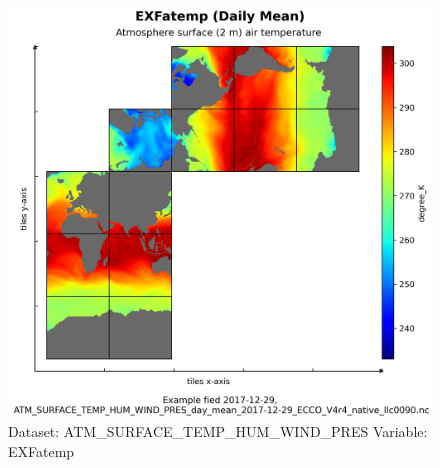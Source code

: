 \begin{figure}[H]
\centering
\includegraphics[scale=0.55]{../images/plots/native_plots/Atmosphere_Surface_Temperature_Humidity_Wind_and_Pressure/EXFatemp.png}
\caption{Dataset: ATM\_SURFACE\_TEMP\_HUM\_WIND\_PRES Variable: EXFatemp}
\label{tab:table-ATM_SURFACE_TEMP_HUM_WIND_PRES_EXFatemp-Plot}
\end{figure}
\pagebreak
